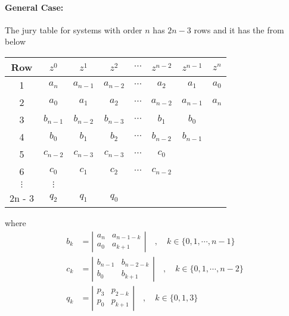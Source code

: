 \documentclass[twoside]{article}
\begin{document}
\paragraph{General Case:} 
%
The jury table for systems with order $n$ has $2n - 3$
rows and it has the from below
%
\begin{center}
  \begin{tabular}{ | c || c c c c c c c|}
    \hline
    Row & $z^0$ & $z^1$ & $z^2$ & $\cdots$ & $z^{n-2}$ & $z^{n-1}$ & $z^n$ \\ \hline \hline
    1 & $a_n$ & $a_{n-1}$ & $a_{n-2}$ & $\cdots$ & $a_2$ & $a_1$ & $a_0$ \\ \hline
    2 & $a_0$ & $a_1$ & $a_2$ & $\cdots$ & $a_{n-2}$ & $a_{n-1}$ & $a_{n}$ \\ \hline
    3 & $b_{n-1}$ & $b_{n-2}$ & $b_{n-3}$ & $\cdots$ & $b_1$ & $b_0$ &
                                                                        \\ \hline
    4 & $b_0$ & $b_1$ & $b_2$ & $\cdots$ & $b_{n-2}$ & $b_{n-1}$ & \\
    \hline
    5 & $c_{n-2}$ & $c_{n-3}$ & $c_{n-3}$ & $\cdots$ & $c_0$ &  &  \\ \hline
    6 & $c_0$ & $c_1$ & $c_2$ & $\cdots$ & $c_{n-2}$ &  & \\ \hline
$\vdots$ & $\vdots$ & & & & &  & \\ \hline
    2n - 3 & $q_2$ & $q_1$ & $q_0$ & & & &  \\ \hline
  \end{tabular}
\end{center}
%
where
%
\begin{align*}
  b_{k} &= \left| \begin{array}{cc} a_n & a_{n-1-k} \\ a_0 &
       a_{k+1} \end{array} \right| \quad , \quad  k \in \lbrace 0,1,
                                                            \cdots,
                                                            n-1
                                                            \rbrace
\\
  c_{k} &= \left| \begin{array}{cc} b_{n-1} & b_{n-2-k} \\ b_0 &
       b_{k+1} \end{array} \right| \quad , \quad  k \in \lbrace 0,1,
                                                            \cdots,
                                                            n-2
                                                            \rbrace
\\
  q_{k} &= \left| \begin{array}{cc} p_3 & p_{2-k} \\ p_0 &
       p_{k+1} \end{array} \right| \quad , \quad  k \in \lbrace 0,1,3 \rbrace
\end{align*}
\end{document}
